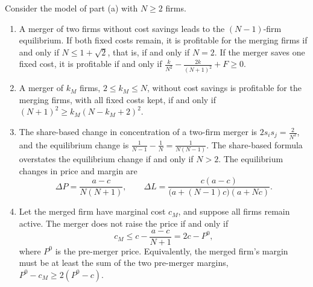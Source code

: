 \begin{proposition}\label{prop:C-merger-cournot}
Consider the model of part (a) with $N \ge 2$ firms.
\begin{enumerate}[label=(\roman*)]
\item A merger of two firms without cost savings leads to the $(N - 1)$-firm equilibrium. If both fixed costs
  remain, it is profitable for the merging firms if and only if $N \le 1 + \sqrt 2$, that is, if and only if $N = 2$.
  If the merger saves one fixed cost, it is profitable if and only if
  $\frac{k}{N^2} - \frac{2k}{(N + 1)^2} + F \ge 0$.
\item A merger of $k_M$ firms, $2 \le k_M \le N$, without cost savings is profitable for the merging firms,
  with all fixed costs kept, if and only if $(N + 1)^2 \ge k_M(N - k_M + 2)^2$.
\item The share-based change in concentration of a two-firm merger is $2s_is_j = \frac{2}{N^2}$, and the
  equilibrium change is $\frac{1}{N - 1} - \frac{1}{N} = \frac{1}{N(N - 1)}$. The share-based formula overstates
  the equilibrium change if and only if $N > 2$. The equilibrium changes in price and margin are
  \begin{equation}\label{eq:C-merger-dL}
  \Delta P = \frac{a - c}{N(N + 1)}, \qquad \Delta L = \frac{c(a - c)}{\big(a + (N - 1)c\big)(a + Nc)} .
  \end{equation}
\item Let the merged firm have marginal cost $c_M$, and suppose all firms remain active. The merger does not
  raise the price if and only if
  \begin{equation}\label{eq:C-merger-synergy}
  c_M \le c - \frac{a - c}{N + 1} = 2c - P^0,
  \end{equation}
  where $P^0$ is the pre-merger price. Equivalently, the merged firm's margin must be at least the sum of the
  two pre-merger margins, $P^0 - c_M \ge 2(P^0 - c)$.
\end{enumerate}
\end{proposition}


